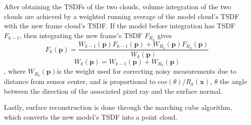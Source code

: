 After obtaining the TSDFs of the two clouds, volume integration of the two clouds are achieved by a weighted running average of the model cloud's TSDF with the new frame cloud's TSDF.
If the model before integration has TSDF \(F_{k-1}\), then integrating the new frame's TSDF \(F_{R_k}\) gives
\[  F_k(\textbf{p}) = \frac{W_{k-1}(\textbf{p}) F_{k-1}(\textbf{p}) + W_{R_k}(\textbf{p}) F_{R_k}(\textbf{p})} {W_k(\textbf{p})}   \]
\[  W_k(\textbf{p}) = W_{k-1}(\textbf{p}) + W_{R_k}(\textbf{p})  \]
, where \( W_{R_k}(\textbf{p}) \)is the weight used for correcting noisy measurements due to distance from sensor center, and is proportional to \( cos(\theta)/R_k(\textbf{x}) \), \(\theta\) the angle between the direction of the associated pixel ray and the surface normal.

Lastly, surface reconstruction is done through the marching cube algorithm, which converts the new model's TSDF into a point cloud.




